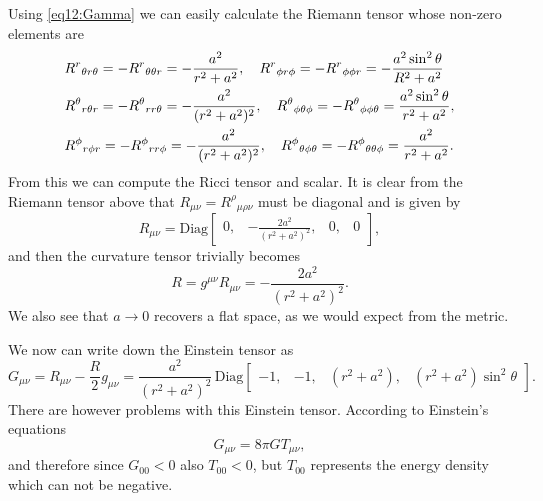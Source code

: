 \documentclass[11pt,a4paper, 
swedish, english %
]{article}
\begin{document}
Using \eqref{eq12:Gamma} we can easily calculate the Riemann tensor
whose non-zero elements are
\begin{equation}
\begin{aligned}
&{R^r}_{\theta r\theta}=-{R^r}_{\theta\theta r}
=-\frac{a^2}{r^2+a^2} \qc
{R^r}_{\phi r\phi}=-{R^r}_{\phi\phi r}
=-\frac{a^2\sin^2\theta}{R^2+a^2}\\
&{R^\theta}_{r\theta r}=-{R^\theta}_{rr\theta}
=-\frac{a^2}{(r^2+a^2)^2}\qc
{R^\theta}_{\phi\theta\phi}=-{R^\theta}_{\phi\phi\theta}
=\frac{a^2\sin^2\theta}{r^2+a^2},\\
&{R^\phi}_{r\phi r}=-{R^\phi}_{rr\phi}
=-\frac{a^2}{(r^2+a^2)^2}\qc
{R^\phi}_{\theta\phi\theta}=-{R^\phi}_{\theta\theta\phi}
=\frac{a^2}{r^2+a^2}.
\end{aligned}
\end{equation}
From this we can compute the Ricci tensor and scalar. It is clear from
the Riemann tensor above that $R_{\mu\nu}={R^\rho}_{\mu\rho\nu}$ must
be diagonal and is given by
\begin{equation}
R_{\mu\nu}=\text{Diag}
\begin{bmatrix}
0,& -\frac{2a^2}{(r^2+a^2)^2},& 0, &0
\end{bmatrix},
\end{equation}
and then the curvature tensor trivially becomes
\begin{equation}
R=g^{\mu\nu}R_{\mu\nu}=-\frac{2a^2}{(r^2+a^2)^2}.
\end{equation}
We also see that $a\to0$ recovers a flat space, as we would expect
from the metric.

We now can write down the Einstein tensor as
\begin{equation}
G_{\mu\nu}=R_{\mu\nu}-\frac{R}{2}g_{\mu\nu}
=\frac{a^2}{(r^2+a^2)^2}\,\text{Diag}\!
\begin{bmatrix}
-1,& -1,&
(r^2+a^2),&
(r^2+a^2)\sin^2\theta
\end{bmatrix}.
\end{equation}
There are however problems with this Einstein tensor. According to
Einstein's equations 
\begin{equation}
G_{\mu\nu}=8\pi G T_{\mu\nu},
\end{equation}
and therefore since $G_{00}<0$ also $T_{00}<0$, but $T_{00}$
represents the energy density which can not be negative. 
\end{document}

